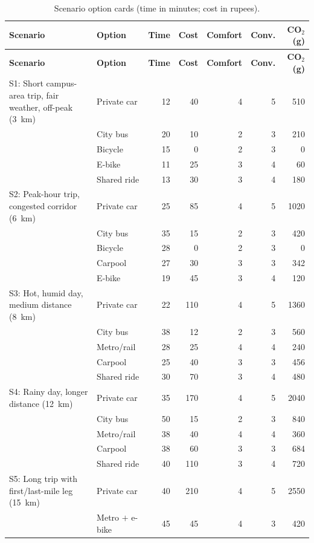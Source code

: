 \documentclass[11pt,a4paper]{article}
\begin{document}
\footnotesize
\begin{longtable}{@{}p{3.4cm}p{2.2cm}rrrrr@{}}
\caption{Scenario option cards (time in minutes; cost in rupees).}
\label{tab:B1}\\
\toprule
\textbf{Scenario} & \textbf{Option} & \textbf{Time} & \textbf{Cost} & \textbf{Comfort} & \textbf{Conv.} & \textbf{CO$_2$ (g)}\\
\midrule
\endfirsthead
\toprule
\textbf{Scenario} & \textbf{Option} & \textbf{Time} & \textbf{Cost} & \textbf{Comfort} & \textbf{Conv.} & \textbf{CO$_2$ (g)}\\
\midrule
\endhead
\bottomrule
\endlastfoot
S1: Short campus-area trip, fair weather, off-peak (3~km) & Private car & 12 & 40 & 4 & 5 & 510\\
 & City bus & 20 & 10 & 2 & 3 & 210\\
 & Bicycle & 15 & 0 & 2 & 3 & 0\\
 & E-bike & 11 & 25 & 3 & 4 & 60\\
 & Shared ride & 13 & 30 & 3 & 4 & 180\\
\midrule
S2: Peak-hour trip, congested corridor (6~km) & Private car & 25 & 85 & 4 & 5 & 1020\\
 & City bus & 35 & 15 & 2 & 3 & 420\\
 & Bicycle & 28 & 0 & 2 & 3 & 0\\
 & Carpool & 27 & 30 & 3 & 3 & 342\\
 & E-bike & 19 & 45 & 3 & 4 & 120\\
\midrule
S3: Hot, humid day, medium distance (8~km) & Private car & 22 & 110 & 4 & 5 & 1360\\
 & City bus & 38 & 12 & 2 & 3 & 560\\
 & Metro/rail & 28 & 25 & 4 & 4 & 240\\
 & Carpool & 25 & 40 & 3 & 3 & 456\\
 & Shared ride & 30 & 70 & 3 & 4 & 480\\
\midrule
S4: Rainy day, longer distance (12~km) & Private car & 35 & 170 & 4 & 5 & 2040\\
 & City bus & 50 & 15 & 2 & 3 & 840\\
 & Metro/rail & 38 & 40 & 4 & 4 & 360\\
 & Carpool & 38 & 60 & 3 & 3 & 684\\
 & Shared ride & 40 & 110 & 3 & 4 & 720\\
\midrule
S5: Long trip with first/last-mile leg (15~km) & Private car & 40 & 210 & 4 & 5 & 2550\\
 & Metro $+$ e-bike & 45 & 45 & 4 & 3 & 420\\

\end{longtable}
\end{document}
